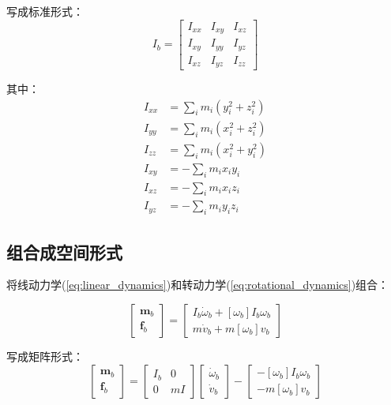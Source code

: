\documentclass[12pt,a4paper]{article}
\begin{document}
写成标准形式：
\begin{equation}
I_b = \begin{bmatrix}
I_{xx} & I_{xy} & I_{xz} \\
I_{xy} & I_{yy} & I_{yz} \\
I_{xz} & I_{yz} & I_{zz}
\end{bmatrix}
\end{equation}

其中：
\begin{align}
I_{xx} &= \sum_i m_i(y_i^2 + z_i^2) \\
I_{yy} &= \sum_i m_i(x_i^2 + z_i^2) \\
I_{zz} &= \sum_i m_i(x_i^2 + y_i^2) \\
I_{xy} &= -\sum_i m_i x_i y_i \\
I_{xz} &= -\sum_i m_i x_i z_i \\
I_{yz} &= -\sum_i m_i y_i z_i
\end{align}

\subsection{组合成空间形式}

将线动力学(\ref{eq:linear_dynamics})和转动力学(\ref{eq:rotational_dynamics})组合：

\begin{equation}
\begin{bmatrix}
\bm{m}_b \\
\bm{f}_b
\end{bmatrix} = \begin{bmatrix}
I_b \dot{\omega}_b + [\omega_b] I_b \omega_b \\
m \dot{v}_b + m [\omega_b] v_b
\end{bmatrix}
\end{equation}

写成矩阵形式：
\begin{equation}
\begin{bmatrix}
\bm{m}_b \\
\bm{f}_b
\end{bmatrix} = \begin{bmatrix}
I_b & 0 \\
0 & mI
\end{bmatrix} \begin{bmatrix}
\dot{\omega}_b \\
\dot{v}_b
\end{bmatrix} - \begin{bmatrix}
-[\omega_b] I_b \omega_b \\
-m [\omega_b] v_b
\end{bmatrix}
\end{equation}
\end{document}
